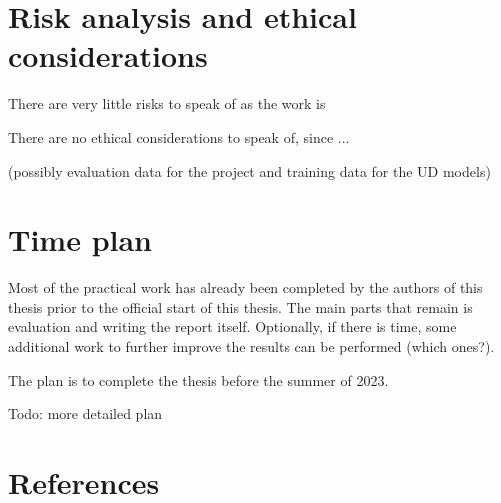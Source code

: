 \documentclass{article}
\begin{document}


\section{Risk analysis and ethical considerations}
There are very little risks to speak of as the work is

There are no ethical considerations to speak of, since ...

(possibly evaluation data for the project and training data for the UD models)

\section{Time plan}
Most of the practical work has already been completed by the authors of this thesis prior to the official start of this thesis.
The main parts that remain is evaluation and writing the report itself. Optionally, if there is time, some additional work to further improve the results can be performed (which ones?).

The plan is to complete the thesis before the summer of 2023.

Todo: more detailed plan

\section{References}






\end{document}
